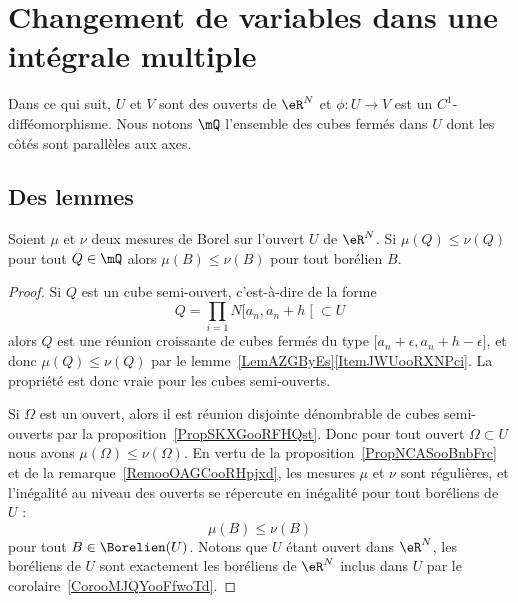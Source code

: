\section{Changement de variables dans une intégrale multiple}

Dans ce qui suit, \( U\) et \( V\) sont des ouverts de \( \eR^N\) et \( \phi\colon U\to V\) est un \( C^1\)-difféomorphisme. Nous notons \( \mQ\) l'ensemble des cubes fermés dans \( U\) dont les côtés sont parallèles aux axes.

\subsection{Des lemmes}

\begin{lemma}      \label{LemooJYCGooIkkDVn}
	Soient \( \mu\) et \( \nu\) deux mesures de Borel sur l'ouvert \( U\) de \( \eR^N\). Si \( \mu(Q)\leq \nu(Q)\) pour tout \( Q\in \mQ\) alors \( \mu(B)\leq \nu(B)\) pour tout borélien \( B\).
\end{lemma}

\begin{proof}
	Si \( Q\) est un cube semi-ouvert, c'est-à-dire de la forme
	\begin{equation}
		Q=\prod_{i=1}N\mathopen[ a_n , a_n+h \mathclose[\subset U
	\end{equation}
	alors \( Q\) est une réunion croissante de cubes fermés du type \( \mathopen[ a_n+\epsilon , a_n+h-\epsilon \mathclose]\), et donc \( \mu(Q)\leq \nu(Q)\) par le lemme~\ref{LemAZGByEs}\ref{ItemJWUooRXNPci}. La propriété est donc vraie pour les cubes semi-ouverts.

	Si \( \Omega\) est un ouvert, alors il est réunion disjointe dénombrable de cubes semi-ouverts par la proposition~\ref{PropSKXGooRFHQst}. Donc pour tout ouvert \( \Omega\subset U\) nous avons \( \mu(\Omega)\leq\nu(\Omega)\). En vertu de la proposition~\ref{PropNCASooBnbFrc} et de la remarque~\ref{RemooOAGCooRHpjxd}, les mesures \( \mu\) et \( \nu\) sont régulières, et l'inégalité au niveau des ouverts se répercute en inégalité pour tout boréliens de \( U\) :
	\begin{equation}
		\mu(B)\leq \nu(B)
	\end{equation}
	pour tout \( B\in\Borelien(U)\). Notons que \( U\) étant ouvert dans \( \eR^N\), les boréliens de \( U\) sont exactement les boréliens de \( \eR^N\) inclus dans \( U\) par le corolaire~\ref{CorooMJQYooFfwoTd}.
\end{proof}

